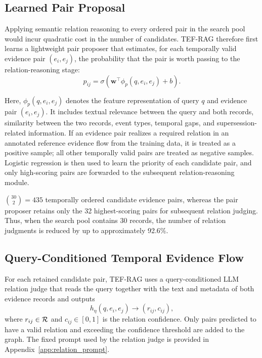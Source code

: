 \subsection{Learned Pair Proposal}

Applying semantic relation reasoning to every ordered pair in the search pool would incur quadratic cost in the number of candidates. TEF-RAG therefore first learns a lightweight pair proposer that estimates, for each temporally valid evidence pair $(e_i,e_j)$, the probability that the pair is worth passing to the relation-reasoning stage:
\begin{equation}
p_{ij}
=
\sigma\!\left(
\mathbf{w}^{\top}\phi_p(q,e_i,e_j)+b
\right).
\label{eq:pair_proposal}
\end{equation}

Here, $\phi_p(q,e_i,e_j)$ denotes the feature representation of query $q$ and evidence pair $(e_i,e_j)$. It includes textual relevance between the query and both records, similarity between the two records, event types, temporal gaps, and supersession-related information. If an evidence pair realizes a required relation in an annotated reference evidence flow from the training data, it is treated as a positive sample; all other temporally valid pairs are treated as negative samples. Logistic regression is then used to learn the priority of each candidate pair, and only high-scoring pairs are forwarded to the subsequent relation-reasoning module.

$\binom{30}{2}=435$ temporally ordered candidate evidence pairs,
whereas the pair proposer retains only the 32 highest-scoring pairs for subsequent relation judging.
Thus, when the search pool contains 30 records, the number of relation judgments is reduced by up to approximately 92.6\%.

\subsection{Query-Conditioned Temporal Evidence Flow}

For each retained candidate pair, TEF-RAG uses a query-conditioned LLM relation judge that reads the query together with the text and metadata of both evidence records and outputs
\begin{equation}
h_{\eta}(q,e_i,e_j)
\rightarrow
(r_{ij},c_{ij}),
\end{equation}
where $r_{ij}\in\mathcal{R}$ and $c_{ij}\in[0,1]$ is the relation confidence. Only pairs predicted to have a valid relation and exceeding the confidence threshold are added to the graph.  The fixed prompt used by the relation judge is provided in Appendix~\ref{app:relation_prompt}.

